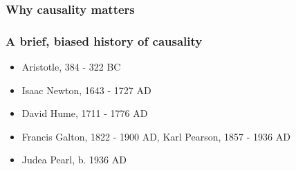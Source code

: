 \begin{frame}
\frametitle{Why causality matters}
\centering
{}

\cite{estruch2013primary}
\end{frame}

\begin{frame}
\frametitle{A brief, biased history of causality}
\begin{itemize}
\item Aristotle, 384 - 322 BC
\item Isaac Newton, 1643 - 1727 AD
\item David Hume, 1711 - 1776 AD
\item Francis Galton, 1822 - 1900 AD, Karl Pearson, 1857 - 1936 AD
\item Judea Pearl, b. 1936 AD
\end{itemize}
\end{frame}

